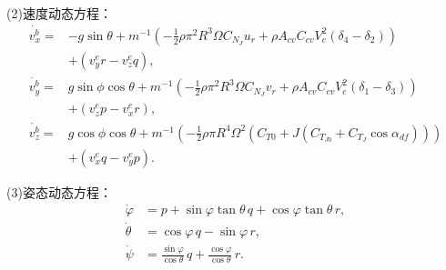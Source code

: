 (2)速度动态方程：
\begin{equation}
    \begin{aligned}
        \dot{v_x^b} =& -g\sin\theta + m^{-1}(-\frac{1}{2}\rho \pi^2 R^3 \Omega C_{N_J} u_r + \rho A_{cv} C_{cv} V_e^2 (\delta_4 - \delta_2)) \\
        &+ (v_y^e r - v_z^e q), \\
        \dot{v_y^b} =& g\sin\phi\cos\theta + m^{-1}(-\frac{1}{2}\rho \pi^2 R^3 \Omega C_{N_J} v_r + \rho A_{cv} C_{cv} V_e^2 (\delta_1 - \delta_3)) \\
        &+ (v_z^e p - v_x^e r), \\
        \dot{v_z^b} =& g\cos\phi\cos\theta + m^{-1}(-\frac{1}{2}\rho \pi R^4 \Omega^2 (C_{T0} + J (C_{T_{J0}} + C_{T_J} \cos\alpha_{df}))) \\
        &+ (v_x^e q - v_y^e p).
    \end{aligned}
    \label{eq:v_dynamic}
\end{equation}

(3)姿态动态方程：
\begin{equation}
    \begin{aligned}
        \dot{\varphi} &= p + \sin\varphi \tan\theta \, q + \cos\varphi \tan\theta \, r, \\
        \dot{\theta}  &= \cos\varphi \, q - \sin\varphi \, r, \\
        \dot{\psi}    &= \frac{\sin\varphi}{\cos\theta} \, q + \frac{\cos\varphi}{\cos\theta} \, r.
    \end{aligned}
    \label{eq:eta_dynamic}
\end{equation}

